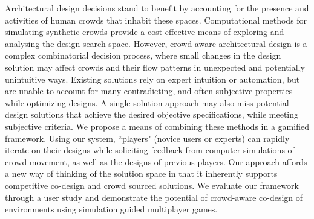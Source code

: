 Architectural design decisions stand to benefit by accounting for the presence and activities of human crowds that inhabit these spaces.  Computational methods for simulating synthetic crowds provide a cost effective means of exploring and analysing the design search space.  However, crowd-aware architectural design is a complex combinatorial decision process, where small changes in the design solution may affect crowds and their flow patterns in unexpected and potentially unintuitive ways. Existing solutions rely on expert intuition or automation, but are unable to account for many contradicting, and often subjective properties while optimizing designs. A single solution approach may also miss potential design solutions that achieve the desired objective specifications, while meeting subjective criteria.  We propose a means of combining these methods in a gamified framework. Using our system, ``players"  (novice users or experts) can rapidly iterate on their designs while soliciting feedback from computer simulations of crowd movement, as well as the designs of previous players. Our approach affords a new way of thinking of the solution space in that it inherently supports competitive co-design and crowd sourced solutions.  We evaluate our framework through a user study and demonstrate the potential of crowd-aware co-design of environments using simulation guided multiplayer games.